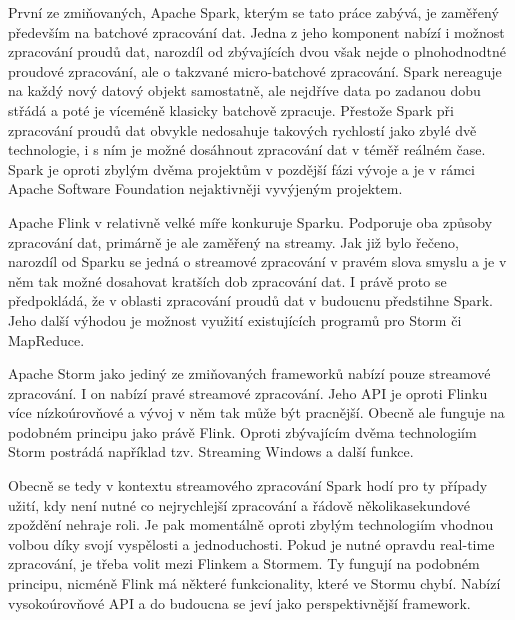 \documentclass[thesis=B,czech]{FITthesis}[2012/06/26]
\begin{document}
	První ze zmiňovaných, Apache Spark, kterým se tato práce zabývá, je zaměřený především na batchové zpracování dat. Jedna z jeho komponent nabízí i možnost zpracování proudů dat, narozdíl od zbývajících dvou však nejde o plnohodnodtné proudové zpracování, ale o takzvané micro-batchové zpracování. Spark nereaguje na každý nový datový objekt samostatně, ale nejdříve data po zadanou dobu střádá a poté je víceméně klasicky batchově zpracuje\cite{??}. Přestože Spark při zpracování proudů dat obvykle nedosahuje takových rychlostí jako zbylé dvě technologie, i s ním je možné dosáhnout zpracování dat v téměř reálném čase\cite{https://yahooeng.tumblr.com/post/135321837876/benchmarking-streaming-computation-engines-at}. Spark je oproti zbylým dvěma projektům v pozdější fázi vývoje a je v rámci Apache Software Foundation nejaktivněji vyvýjeným projektem\cite{??}. 
	
	Apache Flink v relativně velké míře konkuruje Sparku. Podporuje oba způsoby zpracování dat, primárně je ale zaměřený na streamy. Jak již bylo řečeno, narozdíl od Sparku se jedná o streamové zpracování v pravém slova smyslu a je v něm tak možné dosahovat kratších dob zpracování dat. I právě proto se předpokládá, že v oblasti zpracování proudů dat v budoucnu předstihne Spark\cite{http://www.kdnuggets.com/2015/11/fast-big-data-apache-flink-spark-streaming.html}. Jeho další výhodou je možnost využití existujících programů pro Storm či MapReduce. 
	
	Apache Storm jako jediný ze zmiňovaných frameworků nabízí pouze streamové zpracování. I on nabízí pravé streamové zpracování. Jeho API je oproti Flinku více nízkoúrovňové a vývoj v něm tak může být pracnější. Obecně ale funguje na podobném principu jako právě Flink. Oproti zbývajícím dvěma technologiím Storm postrádá například tzv. Streaming Windows a další funkce\cite{http://stackoverflow.com/questions/30699119/what-is-are-the-main-differences-between-flink-and-storm}.
	
	Obecně se tedy v kontextu streamového zpracování Spark hodí pro ty případy užití, kdy není nutné co nejrychlejší zpracování a řádově několikasekundové zpoždění nehraje roli. Je pak momentálně oproti zbylým technologiím vhodnou volbou díky svojí vyspělosti a jednoduchosti. Pokud je nutné opravdu real-time zpracování, je třeba volit mezi Flinkem a Stormem. Ty fungují na podobném principu, nicméně Flink má některé funkcionality, které ve Stormu chybí. Nabízí vysokoúrovňové API a do budoucna se jeví jako perspektivnější framework. 
	
	
	
\end{document}
